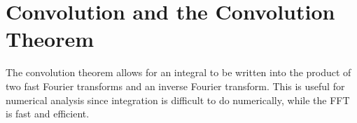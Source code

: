%
%


            \section{Convolution and the Convolution Theorem}

            The convolution theorem allows for an integral to be written into
            the product of two fast Fourier transforms and an inverse Fourier
            transform. This is useful for numerical analysis since integration
            is difficult to do numerically, while the FFT is fast and
            efficient.

